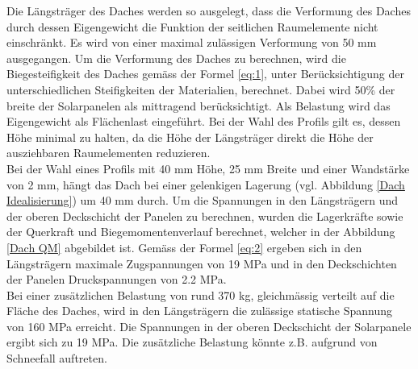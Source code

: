 Die Längsträger des Daches werden so ausgelegt, dass die Verformung des Daches durch dessen Eigengewicht die Funktion der seitlichen Raumelemente nicht einschränkt. Es wird von einer maximal zulässigen Verformung von 50 mm ausgegangen. Um die Verformung des Daches zu berechnen, wird die Biegesteifigkeit des Daches gemäss der Formel \ref{eq:1}, unter Berücksichtigung der unterschiedlichen Steifigkeiten der Materialien, berechnet. Dabei wird 50\% der breite der Solarpanelen als mittragend berücksichtigt. Als Belastung wird das Eigengewicht als Flächenlast eingeführt. Bei der Wahl des Profils gilt es, dessen Höhe minimal zu halten, da die Höhe der Längsträger direkt die Höhe der ausziehbaren Raumelementen reduzieren.\\
Bei der Wahl eines Profils mit 40 mm Höhe, 25 mm Breite und einer Wandstärke von 2 mm, hängt das Dach bei einer gelenkigen Lagerung (vgl. Abbildung \ref{Dach Idealisierung}) um 40 mm durch. Um die Spannungen in den Längsträgern und der oberen Deckschicht der Panelen zu berechnen, wurden die Lagerkräfte sowie der Querkraft und Biegemomentenverlauf berechnet, welcher in der Abbildung \ref{Dach QM} abgebildet ist. Gemäss der Formel \ref{eq:2} ergeben sich in den Längsträgern maximale Zugspannungen von 19 MPa und in den Deckschichten der Panelen Druckspannungen von 2.2 MPa.\\
Bei einer zusätzlichen Belastung von rund 370 kg, gleichmässig verteilt auf die Fläche des Daches, wird in den Längsträgern die zulässige statische Spannung von 160 MPa erreicht. Die Spannungen in der oberen Deckschicht der Solarpanele ergibt sich zu 19 MPa. Die zusätzliche Belastung könnte z.B. aufgrund von Schneefall auftreten.

